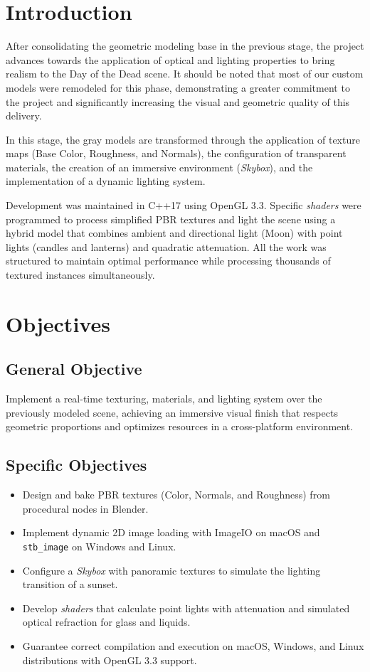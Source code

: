 \documentclass[letter,11pt]{article}
\begin{document}
	\tableofcontents
	
	\newpage
	
	\section{Introduction}
	After consolidating the geometric modeling base in the previous stage, the project advances towards the application of optical and lighting properties to bring realism to the Day of the Dead scene. It should be noted that most of our custom models were remodeled for this phase, demonstrating a greater commitment to the project and significantly increasing the visual and geometric quality of this delivery.
	
	In this stage, the gray models are transformed through the application of texture maps (Base Color, Roughness, and Normals), the configuration of transparent materials, the creation of an immersive environment (\textit{Skybox}), and the implementation of a dynamic lighting system.
	
	Development was maintained in C++17 using OpenGL 3.3. Specific \textit{shaders} were programmed to process simplified PBR textures and light the scene using a hybrid model that combines ambient and directional light (Moon) with point lights (candles and lanterns) and quadratic attenuation. All the work was structured to maintain optimal performance while processing thousands of textured instances simultaneously.
	
	\section{Objectives}
	\subsection{General Objective}
	Implement a real-time texturing, materials, and lighting system over the previously modeled scene, achieving an immersive visual finish that respects geometric proportions and optimizes resources in a cross-platform environment.
	
	\subsection{Specific Objectives}
	\begin{itemize}[leftmargin=*]
		\item Design and bake PBR textures (Color, Normals, and Roughness) from procedural nodes in Blender.
		\item Implement dynamic 2D image loading with ImageIO on macOS and \texttt{stb\_image} on Windows and Linux.
		\item Configure a \textit{Skybox} with panoramic textures to simulate the lighting transition of a sunset.
		\item Develop \textit{shaders} that calculate point lights with attenuation and simulated optical refraction for glass and liquids.
		\item Guarantee correct compilation and execution on macOS, Windows, and Linux distributions with OpenGL 3.3 support.
	\end{itemize}
	
\end{document}

